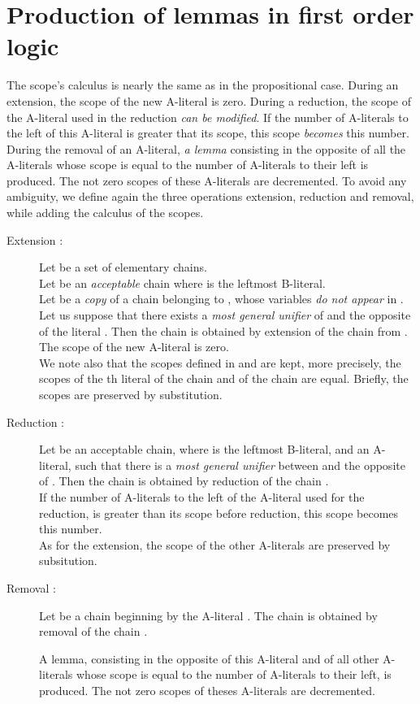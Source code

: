\documentclass{article}
\begin{document}
\section{Production of lemmas in first order logic}

The scope's calculus is nearly the same as in the propositional case.
During an extension, the scope of the new A-literal is zero.
During a reduction, the scope of the A-literal used in the reduction \emph{can be modified}.
If the number of A-literals to the left of this A-literal is greater that its scope, this scope \emph{becomes}
this number.
During the removal of an A-literal, \emph{a lemma} consisting in the opposite of all the A-literals whose scope is equal to the
number of A-literals to their left is produced. 
The not zero scopes of these A-literals are decremented.
To avoid any ambiguity, we define again the three operations extension, reduction and removal, while adding the 
calculus of the scopes.


\begin{description}
\item [Extension :]

Let  be a set of elementary chains.\\
Let  be an \emph{acceptable} chain where  is the leftmost B-literal.\\
Let  be a \emph{copy} of a chain belonging to , whose variables \emph{do not appear} in .\\
Let us suppose that there exists a \emph{most general unifier} of  and the opposite of the literal .
Then the chain   is obtained by extension of the chain  from .\\
The scope of the new A-literal  is zero.\\
We note also that the scopes defined in  and  are kept, more precisely, the scopes of the th literal 
of the chain  and of the chain  are equal. Briefly, the scopes are preserved by substitution.


\item [Reduction :]

Let  be an acceptable chain, where  is the leftmost B-literal, and  an A-literal, such that there is
a \emph{most general unifier} between  and the opposite of . Then the chain  is obtained
by reduction of the chain  .\\
If the number of A-literals to the left of the A-literal used for the reduction, is greater than its scope before reduction,
this scope becomes this number.\\
As for the extension, the scope of the other A-literals are preserved by subsitution.


\item [Removal :] 

Let  be a chain beginning by the A-literal . The chain  is obtained by removal of the chain .

A lemma, consisting in the opposite of this A-literal and of all other A-literals whose scope is equal to the number
of A-literals to their left, is produced. The not zero scopes of theses A-literals are decremented.

\end{description}
\end{document}
